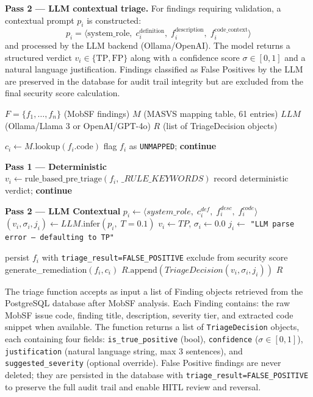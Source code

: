 \documentclass[preprint,12pt,a4paper]{elsarticle}
\begin{document}
\textbf{Pass 2 — LLM contextual triage.} For findings requiring validation, a 
contextual prompt $p_i$ is constructed:
\[
  p_i = \langle \text{system\_role},\; c_i^{\text{definition}},\; f_i^{\text{description}},\; f_i^{\text{code\_context}} \rangle
\]
and processed by the LLM backend (Ollama/OpenAI). The model returns a structured 
verdict $v_i \in \{\text{TP}, \text{FP}\}$ along with a confidence score 
$\sigma \in [0,1]$ and a natural language justification.
Findings classified as False Positives by the LLM are preserved in the database for audit trail 
integrity but are excluded from the final security score calculation.

\begin{algorithm}
\caption{Two-Pass AI Triage (triage\_findings\_batch)}
\label{alg:triage}
\begin{algorithmic}[1]
\Require $F = \{f_1, \ldots, f_n\}$ (MobSF findings)
\Require $M$ (MASVS mapping table, 61 entries)
\Require $LLM$ (Ollama/Llama 3 or OpenAI/GPT-4o)
\Ensure $R$ (list of TriageDecision objects)

    \State $c_i \leftarrow M.\text{lookup}(f_i.\text{code})$
        \State flag $f_i$ as \texttt{UNMAPPED}; \textbf{continue}
    \EndIf

    \State \textbf{Pass 1 --- Deterministic}
    \State $v_i \leftarrow \text{rule\_based\_pre\_triage}(f_i,\, \_RULE\_KEYWORDS)$
        \State record deterministic verdict; \textbf{continue}
    \EndIf

    \State \textbf{Pass 2 --- LLM Contextual}
    \State $p_i \leftarrow \langle system\_role,\; c_i^{def},\; f_i^{desc},\; f_i^{code}\rangle$
    \State $(v_i, \sigma_i, j_i) \leftarrow LLM.\text{infer}(p_i,\; T=0.1)$
        \State $v_i \leftarrow TP$, $\sigma_i \leftarrow 0.0$
        \State $j_i \leftarrow$ \texttt{"LLM parse error — defaulting to TP"}
    \EndIf

        \State persist $f_i$ with \texttt{triage\_result=FALSE\_POSITIVE}
        \State exclude from security score
    \Else
        \State generate\_remediation$(f_i, c_i)$
        \State $R.\text{append}(TriageDecision(v_i, \sigma_i, j_i))$
    \EndIf
\EndFor
\Return $R$
\end{algorithmic}
\end{algorithm}

The triage function accepts as input a list of Finding objects retrieved from the PostgreSQL database after MobSF analysis. Each Finding contains: the raw MobSF issue code, finding title, description, severity tier, and extracted code snippet when available. The function returns a list of \texttt{TriageDecision} objects, each containing four fields: \texttt{is\_true\_positive} (bool), \texttt{confidence} ($\sigma \in [0,1]$), \texttt{justification} (natural language string, max 3 sentences), and \texttt{suggested\_severity} (optional override). False Positive findings are never deleted; they are persisted in the database with \texttt{triage\_result=FALSE\_POSITIVE} to preserve the full audit trail and enable HITL review and reversal.
\end{document}
